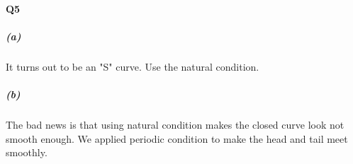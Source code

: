 \documentclass[11pt]{article}
\begin{document}
\paragraph{Q5}
\subparagraph{(a)}
It turns out to be an "S" curve. Use the natural condition.
\begin{figure}[H]
	\centering
\end{figure}
\subparagraph{(b)}
The bad news is that using natural condition makes the closed curve look not smooth enough. We applied periodic condition to make the head and tail meet smoothly.
\begin{figure}[H]
	\centering
\end{figure}
\end{document}
